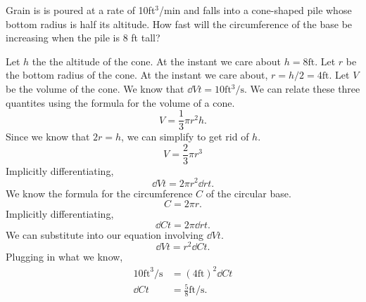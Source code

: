 \begin{example}
	Grain is is poured at a rate of 10ft$^3$/min and falls into a cone-shaped pile whose bottom radius is half its altitude.
	How fast will the circumference of the base be increasing when the pile is 8 ft tall?
\end{example}
Let $h$ the the altitude of the cone.
At the instant we care about $h=8\text{ft}$.
Let $r$ be the bottom radius of the cone.
At the instant we care about, $r=h/2=4\text{ft}$.
Let $V$ be the volume of the cone.
We know that $\dd{V}{t}=10\text{ft$^3$/s}$.
We can relate these three quantites using the formula for the volume of a cone.
\begin{equation*}
	V = \frac{1}{3}\pi r^2 h.
\end{equation*}
\indent
Since we know that $2r = h$, we can simplify to get rid of $h$.
\begin{equation*}
	V = \frac{2}{3}\pi r^3
\end{equation*} 
\indent
Implicitly differentiating,
\begin{equation*}
	\dd{V}{t} = 2\pi r^2 \dd{r}{t}.
\end{equation*}
\indent
We know the formula for the circumference $C$ of the circular base.
\begin{equation*}
	C = 2\pi r.
\end{equation*}
\indent
Implicitly differentiating,
\begin{equation*}
	\dd{C}{t} = 2\pi \dd{r}{t}.
\end{equation*}
\indent
We can substitute into our equation involving $\dd{V}{t}$.
\begin{equation*}
	\dd{V}{t} = r^2\dd{C}{t}.
\end{equation*}
\indent
Plugging in what we know,
\begin{align*}
	10\text{ft}^3\text{/s} &= (4\text{ft})^2\dd{C}{t} \\
	\dd{C}{t} &= \frac{5}{8}\text{ft/s}.
\end{align*}
